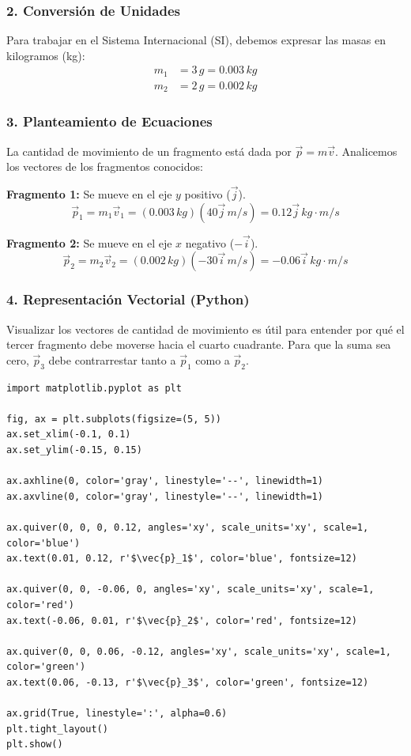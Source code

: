 \documentclass[12pt, a4paper]{article}
\begin{document}
\subsubsection*{2. Conversión de Unidades}
Para trabajar en el Sistema Internacional (SI), debemos expresar las masas en kilogramos (\si{kg}):
\begin{align*}
    m_1 &= 3 \, \si{g} = 0.003 \, \si{kg} \\
    m_2 &= 2 \, \si{g} = 0.002 \, \si{kg}
\end{align*}

\subsubsection*{3. Planteamiento de Ecuaciones}
La cantidad de movimiento de un fragmento está dada por $\vec{p} = m\vec{v}$. Analicemos los vectores de los fragmentos conocidos:

\textbf{Fragmento 1:} Se mueve en el eje $y$ positivo ($\vec{j}$).
\[ \vec{p}_1 = m_1 \vec{v}_1 = (0.003 \, \si{kg}) (40 \vec{j} \, \si{m/s}) = 0.12 \vec{j} \, \si{kg\cdot m/s} \]

\textbf{Fragmento 2:} Se mueve en el eje $x$ negativo ($-\vec{i}$).
\[ \vec{p}_2 = m_2 \vec{v}_2 = (0.002 \, \si{kg}) (-30 \vec{i} \, \si{m/s}) = -0.06 \vec{i} \, \si{kg\cdot m/s} \]

\subsubsection*{4. Representación Vectorial (Python)}
Visualizar los vectores de cantidad de movimiento es útil para entender por qué el tercer fragmento debe moverse hacia el cuarto cuadrante. Para que la suma sea cero, $\vec{p}_3$ debe contrarrestar tanto a $\vec{p}_1$ como a $\vec{p}_2$.

\begin{lstlisting}
import matplotlib.pyplot as plt

fig, ax = plt.subplots(figsize=(5, 5))
ax.set_xlim(-0.1, 0.1)
ax.set_ylim(-0.15, 0.15)

ax.axhline(0, color='gray', linestyle='--', linewidth=1)
ax.axvline(0, color='gray', linestyle='--', linewidth=1)

ax.quiver(0, 0, 0, 0.12, angles='xy', scale_units='xy', scale=1, color='blue')
ax.text(0.01, 0.12, r'$\vec{p}_1$', color='blue', fontsize=12)

ax.quiver(0, 0, -0.06, 0, angles='xy', scale_units='xy', scale=1, color='red')
ax.text(-0.06, 0.01, r'$\vec{p}_2$', color='red', fontsize=12)

ax.quiver(0, 0, 0.06, -0.12, angles='xy', scale_units='xy', scale=1, color='green')
ax.text(0.06, -0.13, r'$\vec{p}_3$', color='green', fontsize=12)

ax.grid(True, linestyle=':', alpha=0.6)
plt.tight_layout()
plt.show()
\end{lstlisting}
\end{document}

